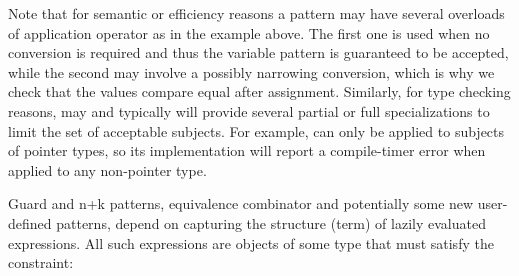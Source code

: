 \noindent
Note that for semantic or efficiency reasons a pattern may have several overloads 
of application operator as in the example above. The first one is used when no 
conversion is required and thus the variable pattern is guaranteed to be accepted, while 
the second may involve a possibly narrowing conversion, which is why we check 
that the values compare equal after assignment. Similarly, for type checking 
reasons,  may and typically will provide several partial 
or full specializations to limit the set of acceptable subjects. For example, 
 can only be applied to subjects 
of pointer types, so its implementation will report a compile-timer error when 
applied to any non-pointer type. 
%
%

Guard and n+k patterns, equivalence combinator and potentially some 
new user-defined patterns, depend on capturing the structure (term) of lazily 
evaluated expressions. All such expressions are objects of some type  
that must satisfy the  constraint:

